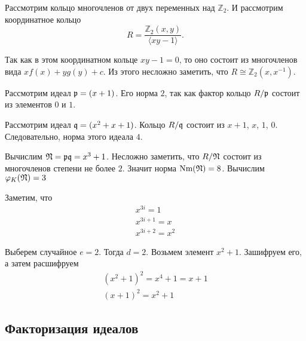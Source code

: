 \documentclass[_00_dissertation.tex]{subfiles}
\begin{document}
\begin{example}
	Рассмотрим кольцо многочленов от двух переменных над $\mathbb{Z}_2$. И рассмотрим координатное кольцо
	\begin{equation*}
		R = \frac{\mathbb{Z}_2(x, y)}{\langle xy - 1\rangle}.
	\end{equation*}
	
	Так как в этом координатном кольце $xy - 1 = 0$, то оно состоит из многочленов вида $xf(x) + yg(y) + c$.
	Из этого несложно заметить, что $R \cong \mathbb{Z}_2(x, x^{-1})$.
	
	Рассмотрим идеал $\mathfrak{p} = (x + 1)$.
	Его норма $2$, так как фактор кольцо $R/\mathfrak{p}$ состоит из элементов $0$ и $1$.
	
	Рассмотрим идеал $\mathfrak{q} = (x^2 + x + 1)$.
	Кольцо $R/\mathfrak{q}$ состоит из $x+1$, $x$, $1$, $0$.
	Следовательно, норма этого идеала $4$.

	Вычислим $\mathfrak{N} = \mathfrak{p}\mathfrak{q} = x^3 + 1$.
	Несложно заметить, что $R/\mathfrak{N}$ состоит из многочленов степени не более $2$.
	Значит норма $\textrm{Nm}(\mathfrak{N}) = 8$.
	Вычислим $\varphi_K(\mathfrak{N}) = 3$

	Заметим, что
	\begin{equation*}
		\begin{array}{l}
			x^{3i} = 1\\
			x^{3i+1} = x\\
			x^{3i+2} = x^2
		\end{array}
	\end{equation*}

	Выберем случайное $e = 2$.
	Тогда $d = 2$.
	Возьмем элемент $x^2 + 1$.
	Зашифруем его, а затем расшифруем
	\begin{equation*}
	    \begin{split}
    		(x^2 + 1)^2 = x^4 + 1 = x + 1\\
	        (x + 1)^2 = x^2 + 1
	    \end{split}
	\end{equation*}
\end{example}

\subsection{Факторизация идеалов}



\end{document}

